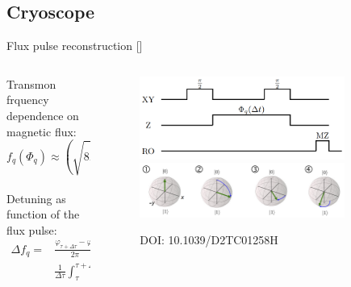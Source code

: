 \documentclass[aspectratio=169,10pt]{beamer}
\begin{document}
\subsection{Cryoscope}

\begin{frame}{Flux pulse reconstruction [\cite{rol_time-domain_2020}]}
  \begin{columns}
    \begin{column}{0.4\textwidth}
      \centering
      Transmon frquency dependence on magnetic flux:
      \begin{equation*}
        f_q(\Phi_q) \approx \left( \sqrt{8E_J E_C \left| \cos\left(\pi \frac{\Phi_q}{\Phi_0}\right) \right|} \right)
      \end{equation*}\\
      \vspace{1em}
      Detuning as function of the flux pulse:
      \begin{align*}
        \Delta f_q = &\frac{\varphi_{\tau+\Delta\tau}-\varphi_\tau}{2\pi} \approx \\
        &\frac{1}{\Delta \tau} \int_{\tau}^{\tau + \Delta \tau} \Delta f_q(\Phi_{q, \tau + \Delta \tau} (t))
      \end{align*}
    \end{column}
    \begin{column}{0.6\textwidth}
      \begin{figure}
        \centering
        \includegraphics[width=0.85\textwidth]{figures/cryoscope_pulse.png}\\
        \vspace{3em}
        \includegraphics[width=0.85\textwidth]{figures/BlochEvolution.png}
        \caption{DOI: 10.1039/D2TC01258H}
      \end{figure}
    \end{column}
  \end{columns}
\end{frame}
\end{document}
